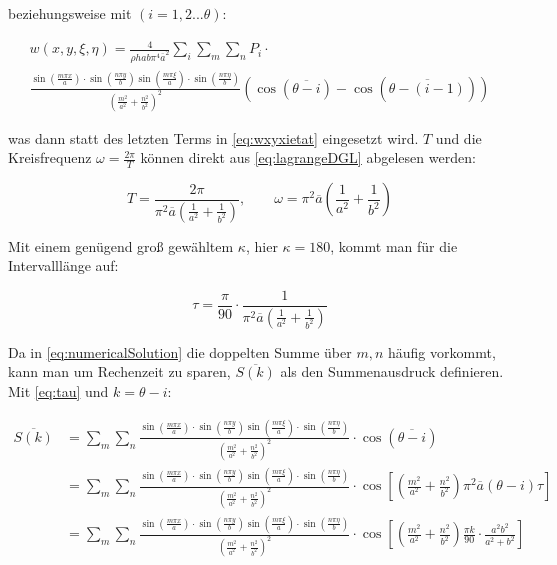 beziehungsweise mit $(i=1,2 ... \theta)$: 

\begin{multline}
 	w(x,y,\xi, \eta) = \frac{4}{\rho h a b \pi^4 \overline{a}^2} \sum_i \sum_m \sum_n P_{i} \cdot \\ \frac{\sin\left(\frac{m \pi x}{a}\right) \cdot \sin\left(\frac{n \pi y}{b}\right) \sin\left(\frac{m \pi \xi}{a}\right) \cdot \sin\left(\frac{n \pi \eta}{b}\right)	}{ \left( \frac{m^2}{a^2} + \frac{n^2}{b^2} \right)^2} \left( \cos(\overline{\theta - i}) - \cos(\overline{\theta - (i-1)}) \right) 	
\label{eq:numericalSolution}
\end{multline}

was dann statt des letzten Terms in \ref{eq:wxyxietat} eingesetzt wird. $T$ und die Kreisfrequenz $\omega = \frac{2 \pi}{T}$ können direkt aus \ref{eq:lagrangeDGL} abgelesen werden: 

\begin{equation}
	T = \frac{2 \pi}{\pi^2 \overline{a} \left( \frac{1}{a^2} + \frac{1}{b^2} \right) }, \qquad \omega=\pi^2 \overline{a} \left( \frac{1}{a^2}+\frac{1}{b^2} \right)
\end{equation}

Mit einem genügend groß gewähltem $\kappa$, hier $\kappa=180$, kommt man für die Intervalllänge auf:

\begin{equation}
	\tau = \frac{\pi}{90} \cdot \frac{1}{\pi^2 \overline{a} \left( \frac{1}{a^2} + \frac{1}{b^2} \right) }
	\label{eq:tau}
\end{equation}

\newpage

Da in \ref{eq:numericalSolution} die doppelten Summe über $m,n$ häufig vorkommt, kann man um Rechenzeit zu sparen, $\overline{S(k)}$ als den Summenausdruck definieren. Mit \ref{eq:tau} und $k=\theta - i$:

\begin{equation}
\begin{split}
\overline{S(k)} & = \sum_m \sum_n \frac{\sin\left(\frac{m \pi x}{a}\right) \cdot \sin\left(\frac{n \pi y}{b}\right) \sin\left(\frac{m \pi \xi}{a}\right) \cdot \sin\left(\frac{n \pi \eta}{b}\right)	}{ \left( \frac{m^2}{a^2} + \frac{n^2}{b^2} \right)^2} \cdot \cos\left(\overline{\theta - i}\right) \\ 
& = \sum_m \sum_n \frac{\sin\left(\frac{m \pi x}{a}\right) \cdot \sin\left(\frac{n \pi y}{b}\right) \sin\left(\frac{m \pi \xi}{a}\right) \cdot \sin\left(\frac{n \pi \eta}{b}\right)	}{ \left( \frac{m^2}{a^2} + \frac{n^2}{b^2} \right)^2} \cdot \cos \left[ \left( \frac{m^2}{a^2}+\frac{n^2}{b^2} \right) \pi^2\overline{a}(\theta - i)\tau\right] \\
&= \sum_m \sum_n \frac{\sin\left(\frac{m \pi x}{a}\right) \cdot \sin\left(\frac{n \pi y}{b}\right) \sin\left(\frac{m \pi \xi}{a}\right) \cdot \sin\left(\frac{n \pi \eta}{b}\right)	}{ \left( \frac{m^2}{a^2} + \frac{n^2}{b^2} \right)^2} \cdot \cos \left[ \left( \frac{m^2}{a^2}+\frac{n^2}{b^2} \right) \frac{\pi k}{90} \cdot \frac{a^{2}b^{2}}{a^{2}+b^{2}} \right] \\
\end{split}
\end{equation}


